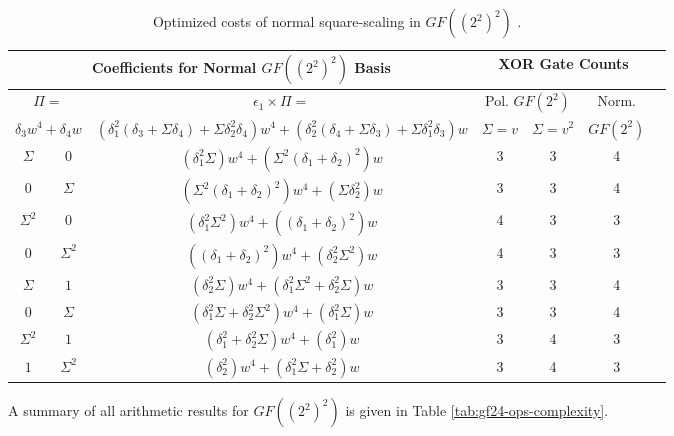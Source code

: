 \begin{table}[ht!]
\small
	\caption{Optimized costs of normal square-scaling in $GF((2^2)^2)$ \cite{Canright05-1}.}
	\begin{tabular}{|c|c|c|c|c|c|c|} \hline
		\multicolumn{3}{|c|}{Coefficients for Normal $GF((2^2)^2)$ Basis} & \multicolumn{3}{c|}{XOR Gate Counts} \\ \hline
		\multicolumn{2}{|c}{$\Pi = $} & \multicolumn{1}{|c|}{$\epsilon_1 \times \Pi = $} & \multicolumn{2}{|c|}{Pol. $GF(2^2)$} & \multicolumn{1}{c|}{Norm.} \\
		\multicolumn{2}{|c|}{$\delta_3 w^4 + \delta_4 w$} & \multicolumn{1}{c}{$(\delta_1^2(\delta_3 + \Sigma\delta_4) + \Sigma\delta_2^2\delta_4) w^4 + (\delta_2^2(\delta_4 + \Sigma\delta_3) + \Sigma\delta_1^2\delta_3) w$} & \multicolumn{1}{|c|}{$\Sigma = v$} & \multicolumn{1}{|c|}{$\Sigma = v^2$} & \multicolumn{1}{|c|}{$GF(2^2)$} \\ \hline

		$\Sigma$ & $0$   & $(\delta_1^2\Sigma)w^4 + (\Sigma^2(\delta_1 + \delta_2)^2)w$        & 3 & 3 & 4 \\ 
		$0$ & $\Sigma$   & $(\Sigma^2(\delta_1 + \delta_2)^2)w^4 + (\Sigma\delta_2^2)w$        & 3 & 3 & 4 \\ 
		$\Sigma^2$ & $0$ & $(\delta_1^2\Sigma^2)w^4 + ((\delta_1 + \delta_2)^2)w$              & 4 & 3 & 3 \\ 
		$0$ & $\Sigma^2$ & $((\delta_1 + \delta_2)^2)w^4 + (\delta_2^2\Sigma^2)w$              & 4 & 3 & 3 \\ 
		$\Sigma$ & $1$   & $(\delta_2^2\Sigma)w^4 + (\delta_1^2\Sigma^2 + \delta_2^2\Sigma)w$  & 3 & 3 & 4 \\ 
		$0$ & $\Sigma$   & $(\delta_1^2\Sigma + \delta_2^2\Sigma^2)w^4 + (\delta_1^2\Sigma)w$  & 3 & 3 & 4 \\ 
		$\Sigma^2$ & $1$ & $(\delta_1^2 + \delta_2^2\Sigma)w^4 + (\delta_1^2)w$                & 3 & 4 & 3 \\ 
		$1$ & $\Sigma^2$ & $(\delta_2^2)w^4 + (\delta_1^2\Sigma + \delta_2^2)w$                & 3 & 4 & 3 \\ \hline
    \end{tabular}
    \label{tab:normalSquareScaleOptimize}
\end{table}

A summary of all arithmetic results for $GF((2^2)^2)$ is given in Table \ref{tab:gf24-ops-complexity}.

